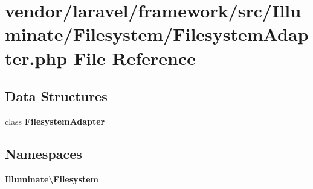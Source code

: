 \section{vendor/laravel/framework/src/\+Illuminate/\+Filesystem/\+Filesystem\+Adapter.php File Reference}
\label{_filesystem_adapter_8php}
\subsection*{Data Structures}
\begin{DoxyCompactItemize}
\item 
class {\bf Filesystem\+Adapter}
\end{DoxyCompactItemize}
\subsection*{Namespaces}
\begin{DoxyCompactItemize}
\item 
 {\bf Illuminate\textbackslash{}\+Filesystem}
\end{DoxyCompactItemize}
